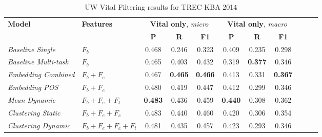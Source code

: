 \documentclass{sig-alternate}
\begin{document}
\begin{table}[tb]
\begin{center}
\begin{tabular}{llccccccccc} 
\toprule
  \multirow{2}{*}{\textbf{Model}} & 
  \multirow{2}{*}{\textbf{Features}} & 
  \multicolumn{3}{c}{\textbf{Vital only}, \emph{micro}} &
  \multicolumn{3}{c}{\textbf{Vital only}, \emph{macro}}
\\ 
  \cmidrule(lr){3-5}
  \cmidrule(lr){6-8}
&   & 
  \textbf{P} & \textbf{R} & \textbf{F1} & 
  \textbf{P} & \textbf{R} & \textbf{F1} \\ 
\midrule
{\textit{Baseline Single}} & $F_b$ &
	0.468 & 0.246 & 0.323 &
  0.409 & 0.235 & 0.298 \\
{\textit{Baseline Multi-task}} & $F_b$ &
	0.465 & 0.403 & 0.432 &
	0.319 & \textbf{0.377} & 0.346 \\
{\textit{Embedding Combined}} & $F_b+F_e$ & 
	0.467 & \textbf{0.465} & \textbf{0.466} &
	0.413 & 0.331 & \textbf{0.367} \\
{\textit{Embedding POS}} & $F_b+F_e$ & 
	0.480 & 0.419 & 0.447 &
	0.412 & 0.299 & 0.346 \\
{\textit{Mean Dynamic}} & $F_b+F_e+F_t$ & 
	\textbf{0.483} & 0.436 & 0.459 &
	\textbf{0.440} & 0.308 & 0.362 \\
{\textit{Clustering Static}} & $F_b+F_e+F_c$ & 
	0.483 & 0.440 & 0.460 &
	0.420 & 0.306 & 0.354 \\
{\textit{Clustering Dynamic}} & $F_b+F_e+F_c+F_t$ & 
  0.481 & 0.435 & 0.457 &
	0.423 & 0.293 & 0.346 \\
\bottomrule
\end{tabular}
\end{center}
\caption{UW Vital Filtering results for TREC KBA 2014}
\label{resMacro}
\end{table}
\end{document}
